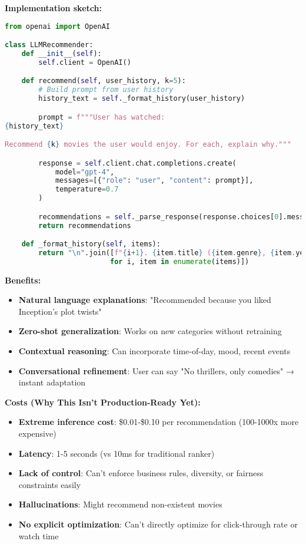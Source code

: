 \documentclass[10pt]{article}
\begin{document}
\textbf{Implementation sketch:}
\begin{lstlisting}[language=Python]
from openai import OpenAI

class LLMRecommender:
    def __init__(self):
        self.client = OpenAI()

    def recommend(self, user_history, k=5):
        # Build prompt from user history
        history_text = self._format_history(user_history)

        prompt = f"""User has watched:
{history_text}

Recommend {k} movies the user would enjoy. For each, explain why."""

        response = self.client.chat.completions.create(
            model="gpt-4",
            messages=[{"role": "user", "content": prompt}],
            temperature=0.7
        )

        recommendations = self._parse_response(response.choices[0].message.content)
        return recommendations

    def _format_history(self, items):
        return "\n".join([f"{i+1}. {item.title} ({item.genre}, {item.year})"
                         for i, item in enumerate(items)])
\end{lstlisting}

\textbf{Benefits:}
\begin{itemize}
\item \textbf{Natural language explanations}: "Recommended because you liked Inception's plot twists"
\item \textbf{Zero-shot generalization}: Works on new categories without retraining
\item \textbf{Contextual reasoning}: Can incorporate time-of-day, mood, recent events
\item \textbf{Conversational refinement}: User can say "No thrillers, only comedies" → instant adaptation
\end{itemize}

\textbf{Costs (Why This Isn't Production-Ready Yet):}
\begin{itemize}
\item \textbf{Extreme inference cost}: \$0.01-\$0.10 per recommendation (100-1000x more expensive)
\item \textbf{Latency}: 1-5 seconds (vs 10ms for traditional ranker)
\item \textbf{Lack of control}: Can't enforce business rules, diversity, or fairness constraints easily
\item \textbf{Hallucinations}: Might recommend non-existent movies
\item \textbf{No explicit optimization}: Can't directly optimize for click-through rate or watch time
\end{itemize}
\end{document}
